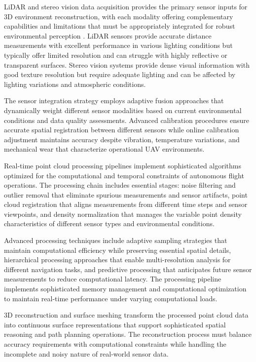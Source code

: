 LiDAR and stereo vision data acquisition provides the primary sensor inputs for 3D environment reconstruction, with each modality offering complementary capabilities and limitations that must be appropriately integrated for robust environmental perception \cite{zhang2014loam}. LiDAR sensors provide accurate distance measurements with excellent performance in various lighting conditions but typically offer limited resolution and can struggle with highly reflective or transparent surfaces. Stereo vision systems provide dense visual information with good texture resolution but require adequate lighting and can be affected by lighting variations and atmospheric conditions.

The sensor integration strategy employs adaptive fusion approaches that dynamically weight different sensor modalities based on current environmental conditions and data quality assessments. Advanced calibration procedures ensure accurate spatial registration between different sensors while online calibration adjustment maintains accuracy despite vibration, temperature variations, and mechanical wear that characterize operational UAV environments.

Real-time point cloud processing pipelines implement sophisticated algorithms optimized for the computational and temporal constraints of autonomous flight operations. The processing chain includes essential stages: noise filtering and outlier removal that eliminate spurious measurements and sensor artifacts, point cloud registration that aligns measurements from different time steps and sensor viewpoints, and density normalization that manages the variable point density characteristics of different sensor types and environmental conditions.

Advanced processing techniques include adaptive sampling strategies that maintain computational efficiency while preserving essential spatial details, hierarchical processing approaches that enable multi-resolution analysis for different navigation tasks, and predictive processing that anticipates future sensor measurements to reduce computational latency. The processing pipeline implements sophisticated memory management and computational optimization to maintain real-time performance under varying computational loads.

3D reconstruction and surface meshing transform the processed point cloud data into continuous surface representations that support sophisticated spatial reasoning and path planning operations. The reconstruction process must balance accuracy requirements with computational constraints while handling the incomplete and noisy nature of real-world sensor data.

